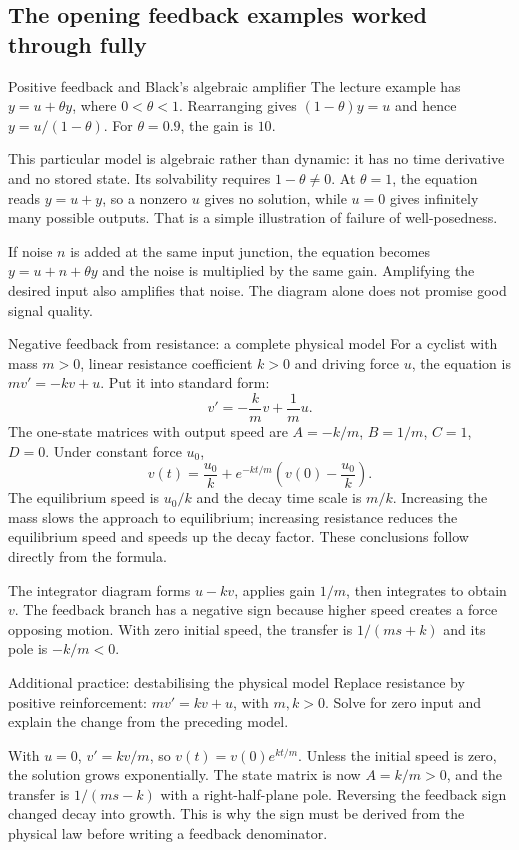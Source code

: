 \subsection{The opening feedback examples worked through fully}
\begin{worked}{Positive feedback and Black's algebraic amplifier}
The lecture example has $y=u+\theta y$, where $0<\theta<1$. Rearranging gives $(1-\theta)y=u$ and hence $y=u/(1-\theta)$. For $\theta=0.9$, the gain is $10$.

This particular model is algebraic rather than dynamic: it has no time derivative and no stored state. Its solvability requires $1-\theta\ne0$. At $\theta=1$, the equation reads $y=u+y$, so a nonzero $u$ gives no solution, while $u=0$ gives infinitely many possible outputs. That is a simple illustration of failure of well-posedness.

If noise $n$ is added at the same input junction, the equation becomes $y=u+n+\theta y$ and the noise is multiplied by the same gain. Amplifying the desired input also amplifies that noise. The diagram alone does not promise good signal quality.
\end{worked}
\begin{worked}{Negative feedback from resistance: a complete physical model}
For a cyclist with mass $m>0$, linear resistance coefficient $k>0$ and driving force $u$, the equation is $mv'=-kv+u$. Put it into standard form:
\[v'=-\frac{k}{m}v+\frac1m u.\]
The one-state matrices with output speed are $A=-k/m$, $B=1/m$, $C=1$, $D=0$. Under constant force $u_0$,
\[v(t)=\frac{u_0}{k}+e^{-kt/m}\left(v(0)-\frac{u_0}{k}\right).\]
The equilibrium speed is $u_0/k$ and the decay time scale is $m/k$. Increasing the mass slows the approach to equilibrium; increasing resistance reduces the equilibrium speed and speeds up the decay factor. These conclusions follow directly from the formula.

The integrator diagram forms $u-kv$, applies gain $1/m$, then integrates to obtain $v$. The feedback branch has a negative sign because higher speed creates a force opposing motion. With zero initial speed, the transfer is $1/(ms+k)$ and its pole is $-k/m<0$.
\end{worked}
\begin{question}{Additional practice: destabilising the physical model}
Replace resistance by positive reinforcement: $mv'=kv+u$, with $m,k>0$. Solve for zero input and explain the change from the preceding model.
\end{question}
\begin{answer}
With $u=0$, $v'=kv/m$, so $v(t)=v(0)e^{kt/m}$. Unless the initial speed is zero, the solution grows exponentially. The state matrix is now $A=k/m>0$, and the transfer is $1/(ms-k)$ with a right-half-plane pole. Reversing the feedback sign changed decay into growth. This is why the sign must be derived from the physical law before writing a feedback denominator.
\end{answer}
